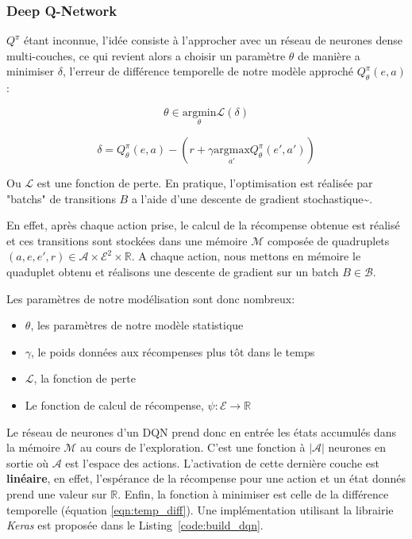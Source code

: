 \documentclass[11pt]{article}
\begin{document}
\subsubsection{Deep Q-Network}
\label{sec:org7770106}

\(Q^\pi\) étant inconnue, l'idée consiste à l'approcher avec un réseau de neurones dense multi-couches, ce qui revient alors a choisir un paramètre \(\theta\) de manière a minimiser \(\delta\), l'erreur de différence temporelle de notre modèle approché \(Q_\theta^\pi(e,a)\):


\begin{latex}
\[
\theta \in \underset{\theta}{\mathrm{argmin}} \mathcal{L}(\delta)
\]
\end{latex}

\begin{equation}
\label{eqn:temp_diff}
  \delta = Q^\pi_\theta(e,a) - (r + \gamma\underset{a'}{\mathrm{argmax}} Q^\pi_\theta(e', a'))
\end{equation}

Ou \(\mathcal{L}\) est une fonction de perte. En pratique, l'optimisation est réalisée par "batchs" de transitions \(B\) a l'aide d'une descente de gradient stochastique\textasciitilde{}\cite{GaoSLIS17}.

En effet, après chaque action prise, le calcul de la récompense obtenue est réalisé et ces transitions sont stockées dans une mémoire \(\mathcal{M}\) composée de quadruplets \((a, e, e', r) \in \mathcal{A}\times\mathcal{E}^2\times\mathbb{R}\). A chaque action, nous mettons en mémoire le quaduplet obtenu et réalisons une descente de gradient sur un batch \(B \in \mathcal{B}\).

Les paramètres de notre modélisation sont donc nombreux:

\begin{itemize}
\item \(\theta\), les paramètres de notre modèle statistique
\item \(\gamma\), le poids données aux récompenses plus tôt dans le temps
\item \(\mathcal{L}\), la fonction de perte
\item Le fonction de calcul de récompense, \(\psi : \mathcal{E} \longrightarrow \mathbb{R}\)
\end{itemize}

Le réseau de neurones d'un DQN prend donc en entrée les états accumulés dans la mémoire \(\mathcal{M}\) au cours de l'exploration. C'est une fonction à \(|\mathcal{A}|\) neurones en sortie où \(\mathcal{A}\) est l'espace des actions. L'activation de cette dernière couche est \textbf{linéaire}, en effet, l'espérance de la récompense pour une action et un état donnés prend une valeur sur \(\mathbb{R}\). Enfin, la fonction à minimiser est celle de la différence temporelle (équation \ref{eqn:temp_diff}). Une implémentation utilisant la librairie \emph{Keras} est proposée dans le Listing \ref{code:build_dqn}.
\end{document}
